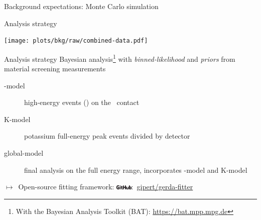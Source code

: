 \documentclass[10pt,aspectratio=169]{beamer}
\newcommand{\github}[1]{\includegraphics[height=6pt]{logos/gihub-logo.png}:~\href{https://github.com/#1}{#1}}
\newcommand{\arrow}{$\longmapsto$}
\begin{document}
\begin{frame}{Background expectations: Monte Carlo simulation}
  \begin{center}
  \end{center}
\end{frame}
\begin{frame}{Analysis strategy}
  \begin{center}
    \texttt{[image: plots/bkg/raw/combined-data.pdf]}
  \end{center}
\end{frame}
\begin{frame}{Analysis strategy}
  \alert{Bayesian} analysis\footnote{With the Bayesian Analysis Toolkit (BAT):
  \url{https://bat.mpp.mpg.de}} with \emph{binned-likelihood} and \emph{priors}
  from material screening measurements
  \begin{description}
    \item[\a-model] \alert{high-energy events} (\a) on the \pplus\ contact
    \item[K-model] \alert{potassium full-energy peak} events divided by
      detector
    \item[global-model] final analysis on the \alert{full energy range},
      incorporates \a-model and K-model
  \end{description}

  \arrow\ Open-source fitting framework: \github{gipert/gerda-fitter}
\end{frame}
\end{document}
